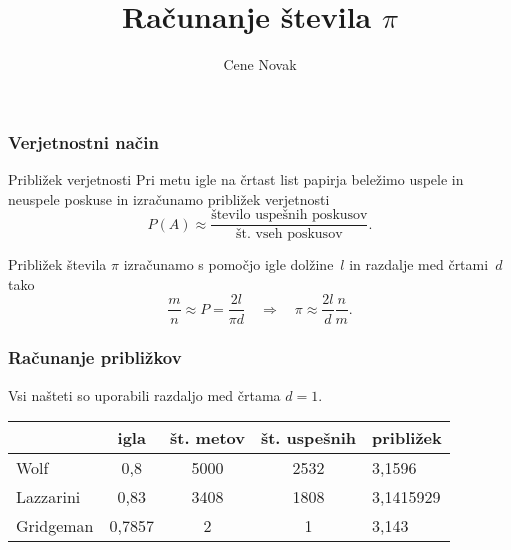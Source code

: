 \documentclass{beamer}
\begin{document}

\title{Računanje števila $\pi$}
\author{Cene Novak}

\begin{frame}
   \maketitle
\end{frame}


\begin{frame}
    \frametitle{Verjetnostni način}
    \begin{block}{Približek verjetnosti}
        Pri metu igle na črtast list papirja beležimo uspele in neuspele poskuse in izračunamo približek verjetnosti
        $$ P(A) \approx \frac{\text{število uspešnih poskusov}}{\text{št. vseh poskusov}}. $$
    \end{block} \pause

    Približek števila $\pi$ izračunamo s pomočjo igle dolžine~$l$ in razdalje med črtami~$d$ tako
    $$\frac{m}{n} \approx P = \frac{2l}{\pi d} \quad \Rightarrow \quad \pi \approx \frac{2l}{d}\frac{n}{m}. $$
\end{frame}


\begin{frame}
    \frametitle{Računanje približkov}
    Vsi našteti so uporabili razdaljo med črtama $d=1$.
    \begin{table}
        \centering
    \begin{tabular}{|l|c|c|c|l|} 
        \hline
         & \textbf{igla} & \textbf{št. metov} & \textbf{št. uspešnih} & \textbf{približek} \\ 
       \hline
       Wolf & 0,8 & 5000 & 2532 & 3,1596\\ 
       \hline
       Lazzarini & 0,83 & 3408 & 1808 & 3,1415929 \\
       \hline
       Gridgeman & 0,7857 & 2 & 1 & 3,143\\
       \hline
       \end{tabular}
    \end{table}
\end{frame}

\end{document}
